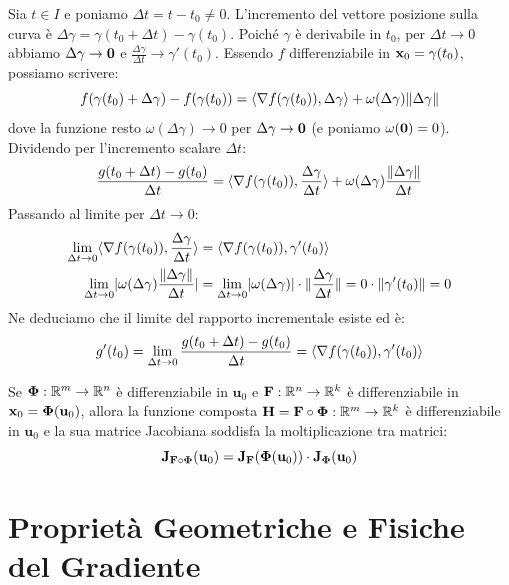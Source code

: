 \begin{dimostrazione}
Sia $t \in I$ e poniamo $\Delta t = t - t_0 \neq 0$. L'incremento del vettore posizione sulla curva è $\Delta \gamma = \gamma(t_0 + \Delta t) - \gamma(t_0)$.
Poiché $\gamma$ è derivabile in $t_0$, per $\Delta t \to 0$ abbiamo $\Delta \gamma \to \mathbf{0}$ e $\frac{\Delta \gamma}{\Delta t} \to \gamma'(t_0)$.
Essendo $f$ differenziabile in $\mathbf{x}_0 = \gamma(t_0)$, possiamo scrivere:
\[
f(\gamma(t_0) + \Delta \gamma) - f(\gamma(t_0)) = \langle\nabla f(\gamma(t_0)), \Delta \gamma\rangle + \omega(\Delta \gamma) \lVert\Delta \gamma\rVert
\]
dove la funzione resto $\omega(\Delta \gamma) \to 0$ per $\Delta \gamma \to \mathbf{0}$ (e poniamo $\omega(\mathbf{0}) = 0$).
Dividendo per l'incremento scalare $\Delta t$:
\[
\frac{g(t_0 + \Delta t) - g(t_0)}{\Delta t} = \langle\nabla f(\gamma(t_0)), \frac{\Delta \gamma}{\Delta t}\rangle + \omega(\Delta \gamma) \frac{\lVert\Delta \gamma\rVert}{\Delta t}
\]
Passando al limite per $\Delta t \to 0$:
\begin{align*}
\lim_{\Delta t \to 0} \langle\nabla f(\gamma(t_0)), \frac{\Delta \gamma}{\Delta t}\rangle &= \langle\nabla f(\gamma(t_0)), \gamma'(t_0)\rangle \\
\lim_{\Delta t \to 0} \lvert\omega(\Delta \gamma) \frac{\lVert\Delta \gamma\rVert}{\Delta t}\rvert &= \lim_{\Delta t \to 0} \lvert\omega(\Delta \gamma)\rvert \cdot \lVert\frac{\Delta \gamma}{\Delta t}\rVert = 0 \cdot \lVert\gamma'(t_0)\rVert = 0
\end{align*}
Ne deduciamo che il limite del rapporto incrementale esiste ed è:
\[
g'(t_0) = \lim_{\Delta t \to 0} \frac{g(t_0 + \Delta t) - g(t_0)}{\Delta t} = \langle\nabla f(\gamma(t_0)), \gamma'(t_0)\rangle
\]
\end{dimostrazione}

\begin{osservazione}
Se $\boldsymbol{\Phi}: \mathbb{R}^m \to \mathbb{R}^n$ è differenziabile in $\mathbf{u}_0$ e $\mathbf{F}: \mathbb{R}^n \to \mathbb{R}^k$ è differenziabile in $\mathbf{x}_0 = \boldsymbol{\Phi}(\mathbf{u}_0)$, allora la funzione composta $\mathbf{H} = \mathbf{F} \circ \boldsymbol{\Phi}: \mathbb{R}^m \to \mathbb{R}^k$ è differenziabile in $\mathbf{u}_0$ e la sua matrice Jacobiana soddisfa la moltiplicazione tra matrici:
\[
\mathbf{J}_{\mathbf{F} \circ \boldsymbol{\Phi}}(\mathbf{u}_0) = \mathbf{J}_{\mathbf{F}}(\boldsymbol{\Phi}(\mathbf{u}_0)) \cdot \mathbf{J}_{\boldsymbol{\Phi}}(\mathbf{u}_0)
\]
\end{osservazione}

\section{Proprietà Geometriche e Fisiche del Gradiente}

